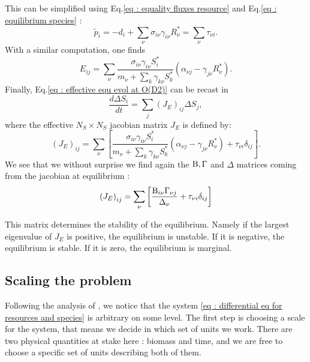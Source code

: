 \documentclass[12pt]{report}
\begin{document}
This can be simplified using Eq.\eqref{eq : equality fluxes resource} and Eq.\eqref{eq : equilibrium species} :
\begin{equation}
\tilde{p}_i=-d_i +\sum_\nu \sigma_{i\nu}\gamma_{i\nu}R^*_\nu = \sum_\nu \tau_{\nu i}.
\end{equation}
With a similar computation, one finds
\begin{equation}
E_{ij}=\sum_\nu \frac{\sigma_{i\nu}\gamma_{i\nu}S^*_i}{m_\nu+\sum_k \gamma_{k\nu}S^*_k} \left(\alpha_{\nu j}-\gamma_{j\nu}R^*_\nu\right).
\end{equation}
Finally, Eq.\eqref{eq : effective equ evol at O(D2)} can be recast in
\begin{equation}
\frac{d\Delta S_i}{dt} = \sum_j (J_E)_{ij} \Delta S_j,
\end{equation}
where the effective $N_S\times N_S$ jacobian matrix $J_E$ is defined by:
\begin{equation}
(J_E)_{ij}=\sum_\nu \left[\frac{\sigma_{i\nu}\gamma_{i\nu}S^*_i}{m_\nu+\sum_k \gamma_{k\nu}S^*_k} \left(\alpha_{\nu j}-\gamma_{j\nu}R^*_\nu\right)+\tau_{\nu i}\delta_{ij}\right].
\end{equation}
We see that we without surprise we find again the $\text{B}, \Gamma $ and $\Delta$ matrices coming from the jacobian at equilibrium :
\begin{equation}
\left(J_E\right)_{ij}=\sum_\nu \left[\frac{\text{B}_{i\nu}\Gamma_{\nu j}}{\Delta_\nu}+\tau_{\nu i} \delta_{ij}\right]
\end{equation}

This matrix determines the stability of the equilibrium. Namely if the largest eigenvalue of $J_E$ is positive, the equilibrium is unstable. If it is negative, the equilibrium is stable. If it is zero, the equilibrium is marginal.


\subsection{Scaling the problem}
Following the analysis of \cite{barbier_cavity_2017}, we notice that the system \eqref{eq : differential eq for resources and species} is arbitrary on some level. The first step is choosing a scale for the system, that means we decide in which set of units we work. There are two physical quantities at stake here : biomass and time, and we are free to choose a specific set of units describing both of them.
\end{document}
